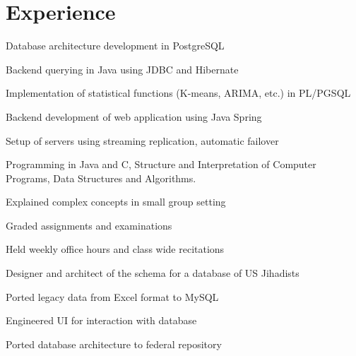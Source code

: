 \documentclass[]{deedy-resume}
\begin{document}
\begin{minipage}[t]{0.66\textwidth} 


\section{Experience}

\vspace{\topsep} %
\begin{tightemize}\item Database architecture development in PostgreSQL
\item Backend querying in Java using JDBC and Hibernate
\item Implementation of statistical functions (K-means, ARIMA, etc.) in PL/PGSQL
\item Backend development of web application using Java Spring
\item Setup of servers using streaming replication, automatic failover
\end{tightemize}
\sectionsep

\begin{tightemize}
\item Programming in Java and C, Structure and Interpretation of Computer Programs, Data Structures and Algorithms.
\item Explained complex concepts in small group setting
\item Graded assignments and examinations
\item Held weekly office hours and class wide recitations
\end{tightemize}
\sectionsep

\begin{tightemize}
\item Designer and architect of the schema for a database of US Jihadists
\item Ported legacy data from Excel format to MySQL
\item Engineered UI for interaction with database
\item Ported database architecture to federal repository
\end{tightemize}
\sectionsep


\end{minipage}
\end{document}
